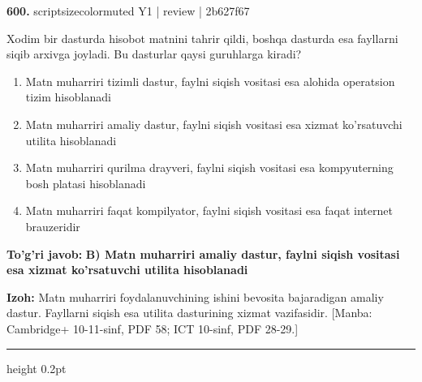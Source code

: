 \documentclass[10pt,a4paper]{article}
\begin{document}
{\bfseries\sffamily\color{ink} 600.} {scriptsizecolor{muted} Y1 | review | 2b627f67}
\par
Xodim bir dasturda hisobot matnini tahrir qildi, boshqa dasturda esa fayllarni siqib arxivga joyladi. Bu dasturlar qaysi guruhlarga kiradi?
\begin{enumerate}[label=\Alph*),leftmargin=9mm]
\item Matn muharriri tizimli dastur, faylni siqish vositasi esa alohida operatsion tizim hisoblanadi
\item Matn muharriri amaliy dastur, faylni siqish vositasi esa xizmat ko'rsatuvchi utilita hisoblanadi
\item Matn muharriri qurilma drayveri, faylni siqish vositasi esa kompyuterning bosh platasi hisoblanadi
\item Matn muharriri faqat kompilyator, faylni siqish vositasi esa faqat internet brauzeridir
\end{enumerate}
\begin{tcolorbox}[enhanced,breakable,colback=teal!4,colframe=teal!60!black,boxrule=0.45pt,arc=1.2mm,left=2.7mm,right=2.7mm,top=1.8mm,bottom=1.8mm,before skip=2mm,after skip=2mm]
{\bfseries\sffamily\color{teal}To'g'ri javob:} \textbf{B) Matn muharriri amaliy dastur, faylni siqish vositasi esa xizmat ko'rsatuvchi utilita hisoblanadi}
\par\smallskip
{\bfseries Izoh:} Matn muharriri foydalanuvchining ishini bevosita bajaradigan amaliy dastur. Fayllarni siqish esa utilita dasturining xizmat vazifasidir. [Manba: Cambridge+ 10-11-sinf, PDF 58; ICT 10-sinf, PDF 28-29.]
\end{tcolorbox}
\vspace{2mm}\hrule height 0.2pt\vspace{3mm}
\end{document}
